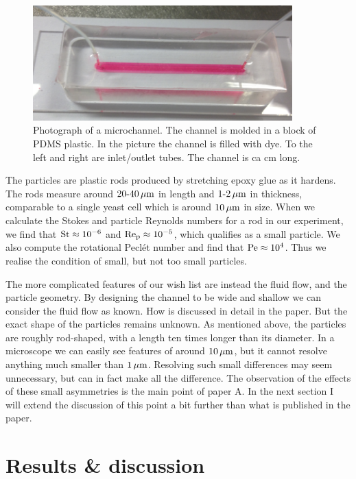 \documentclass[thesis.tex]{subfiles}
\begin{document}
\begin{figure}
\includegraphics[width=10cm]{figs/expsetup_lores.png}%
\caption{\label{fig:exp_setup} Photograph of a microchannel. The channel is molded in a block of PDMS plastic. In the picture the channel is filled with dye. To the left and right are inlet/outlet tubes. The channel is ca \unit[5]{cm} long.}%
\end{figure}

The particles are plastic rods produced by stretching epoxy glue as it hardens. The rods measure around $\unit[20\textrm{-}40]{\mu m}$ in length and $\unit[1\textrm{-}2]{\mu m}$ in thickness, comparable to a single yeast cell which is around $\unit[10]{\mu m}$ in size. When we calculate the Stokes and particle Reynolds numbers for a rod in our experiment, we find that $\mbox{St} \approx 10^{-6}$ and $\mbox{Re}_{\mathrm p} \approx 10^{-5}$, which qualifies as a small particle. We also compute the rotational Pecl\'et number and find that $\mbox{Pe}\approx10^{4}$. Thus we realise the condition of small, but not too small particles. 

The more complicated features of our wish list are instead the fluid flow, and the particle geometry. By designing the channel to be wide and shallow we can consider the fluid flow as known. How is discussed in detail in the paper. But the exact shape of the particles remains unknown. As mentioned above, the particles are roughly rod-shaped, with a length ten times longer than its diameter. In a microscope we can easily see features of around $\unit[10]{\mu m}$, but it cannot resolve anything much smaller than $\unit[1]{\mu m}$. Resolving such small differences may seem unnecessary, but can in fact make all the difference. The observation of the effects of these small asymmetries is the main point of paper A. In the next section I will extend the discussion of this point a bit further than what is published in the paper.

\section{Results \& discussion}
\end{document}
